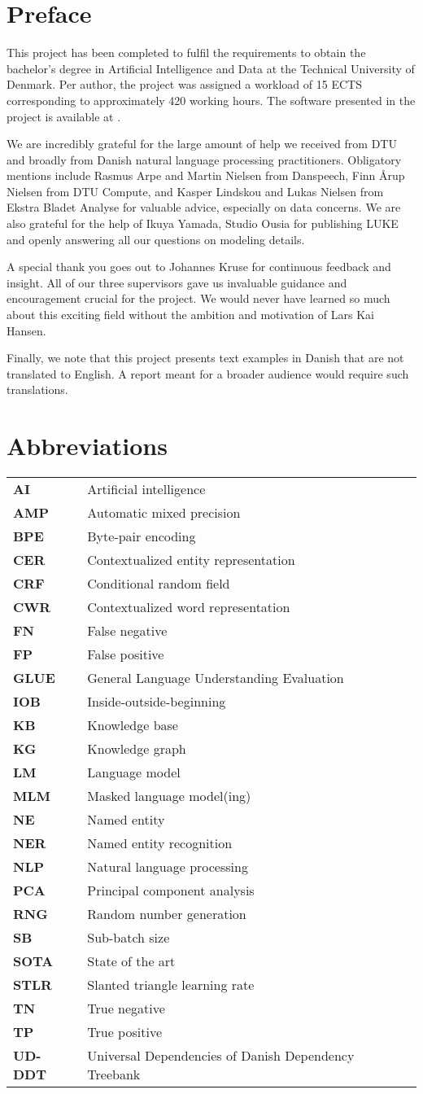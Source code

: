 \documentclass[12pt, fleqn]{report}
\newcommand{\abbrv}[2]{\vspace{0.1cm}\textbf{#1} & #2\\}
\begin{document}
\chapter*{Preface}
This project has been completed to fulfil the requirements to obtain the bachelor's degree in Artificial Intelligence and Data at the Technical University of Denmark.
Per author, the project was assigned a workload of 15 ECTS corresponding to approximately 420 working hours.
The software presented in the project is available at .

We are incredibly grateful for the large amount of help we received from DTU and broadly from Danish natural language processing practitioners.
Obligatory mentions include Rasmus Arpe and Martin Nielsen from Danspeech, Finn Årup Nielsen from DTU Compute, and Kasper Lindskou and Lukas Nielsen from Ekstra Bladet Analyse for valuable advice, especially on data concerns.
We are also grateful for the help of Ikuya Yamada, Studio Ousia for publishing LUKE and openly answering all our questions on modeling details.

A special thank you goes out to Johannes Kruse for continuous feedback and insight.
All of our three supervisors gave us invaluable guidance and encouragement crucial for the project.
We would never have learned so much about this exciting field without the ambition and motivation of Lars Kai Hansen.

Finally, we note that this project presents text examples in Danish that are not translated to English.
A report meant for a broader audience would require such translations.

\chapter*{Abbreviations}
\begin{table}[H]
    \begin{tabular}{@{}l l}
        \abbrv{AI}{Artificial intelligence}
        \abbrv{AMP}{Automatic mixed precision}
        \abbrv{BPE}{Byte-pair encoding}
        \abbrv{CER}{Contextualized entity representation}
        \abbrv{CRF}{Conditional random field}
        \abbrv{CWR}{Contextualized word representation}
        \abbrv{FN}{False negative}
        \abbrv{FP}{False positive}
        \abbrv{GLUE}{General Language Understanding Evaluation}
        \abbrv{IOB}{Inside-outside-beginning}
        \abbrv{KB}{Knowledge base}
        \abbrv{KG}{Knowledge graph}
        \abbrv{LM}{Language model}
        \abbrv{MLM}{Masked language model(ing)}
        \abbrv{NE}{Named entity}
        \abbrv{NER}{Named entity recognition}
        \abbrv{NLP}{Natural language processing}
        \abbrv{PCA}{Principal component analysis}
        \abbrv{RNG}{Random number generation}
        \abbrv{SB}{Sub-batch size}
        \abbrv{SOTA}{State of the art}
        \abbrv{STLR}{Slanted triangle learning rate}
        \abbrv{TN}{True negative}
        \abbrv{TP}{True positive}
        \abbrv{UD-DDT}{Universal Dependencies of Danish Dependency Treebank}
    \end{tabular}
\end{table}\noindent
\end{document}
